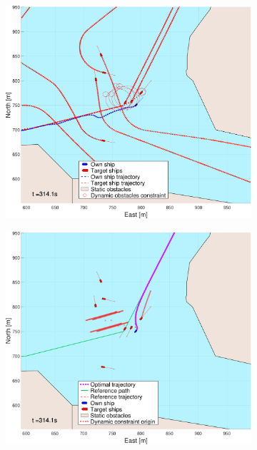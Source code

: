\begin{figure}[ht!]
\begin{subfigure}[b]{0.494\textwidth}
        \subcaption{}
    \end{subfigure}
    \hfill
    \\
    \begin{subfigure}[b]{0.494\textwidth}
        \centering
        \includegraphics[width=\textwidth]{Images/NewFigures/Trheimfjord/_Simple_0fig1_time=315}
        \subcaption{}
    \end{subfigure}
    \hfill
    \begin{subfigure}[b]{0.494\textwidth}
        \centering
        \includegraphics[width=\textwidth]{Images/NewFigures/Trheimfjord/_Simple_0fig999_time=315}

\end{subfigure}
\end{figure}
